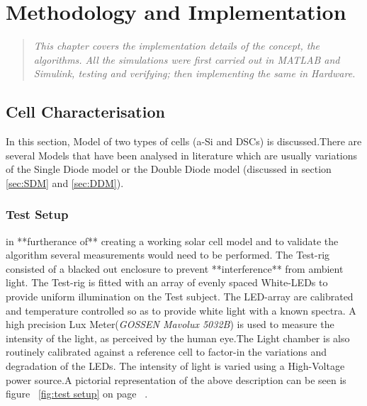 \chapter{Methodology and Implementation}
\begin{quote} 
\it This chapter covers the implementation details of the concept, the algorithms. All the simulations were first carried out in MATLAB{\textregistered} and Simulink{\textregistered}, testing and verifying; then implementing the same in Hardware.
\end{quote}


\section{Cell Characterisation}
In this section, Model of two types of cells (\ac{a-Si} and \ac{DSCs}) is discussed.There are several Models that have been analysed in literature which are usually variations of the Single Diode model or the Double Diode model (discussed in section \ref{sec:SDM} and \ref{sec:DDM}).
 
\subsection{Test Setup}
in **furtherance of** creating a working solar cell model and to validate the algorithm several measurements would need to be performed. The Test-rig consisted of a blacked out enclosure to prevent **interference** from ambient light. The Test-rig is fitted with an array of evenly spaced White-\ac{LED}s to provide uniform illumination on the Test subject. The \ac{LED}-array are calibrated and temperature controlled so as to provide white light with a known spectra. A high precision Lux Meter(\textit{GOSSEN Mavolux 5032B}) is used to measure the  intensity of the light, as perceived by the human eye.The Light chamber is also routinely calibrated against a reference cell to factor-in the variations and degradation of the \ac{LED}s. The intensity of light is varied using a High-Voltage power source.A pictorial representation of the above description can be seen is figure  ~\ref{fig:test setup} on page ~\pageref{fig:test setup}. \\

